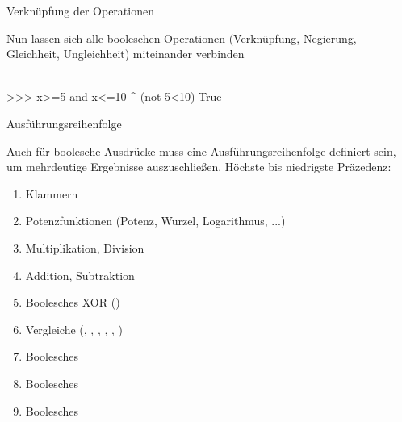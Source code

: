         \begin{frame}[fragile]{Verknüpfung der Operationen}
            
            Nun lassen sich alle booleschen Operationen (Verknüpfung, Negierung, Gleichheit, Ungleichheit) miteinander verbinden\\~\
            
\begin{pyconcode}
>>> x>=5 and x<=10 ^ (not 5<10)
True
\end{pyconcode}     

        \end{frame}
        
        \begin{frame}[fragile]{Ausführungsreihenfolge}
            
            Auch für boolesche Ausdrücke muss eine Ausführungsreihenfolge definiert sein, um mehrdeutige Ergebnisse auszuschließen. Höchste bis niedrigste Präzedenz:
            
            \begin{enumerate}
                \item Klammern
                \item Potenzfunktionen (Potenz, Wurzel, Logarithmus, ...)
                \item Multiplikation, Division
                \item Addition, Subtraktion
                \item Boolesches XOR (\code{\^})
                \item Vergleiche (\code{==}, \code{!=}, \code{<}, \code{>}, \code{<=}, \code{>=})
                \item Boolesches 
                \item Boolesches 
                \item Boolesches 
                
            \end{enumerate}
        \end{frame}
        
